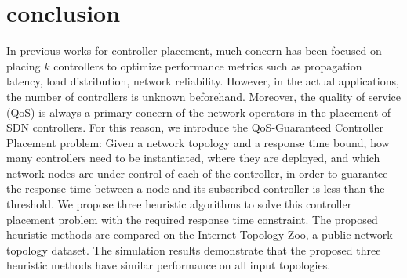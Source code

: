 \documentclass[conference]{IEEEtran}
\begin{document}
\section{conclusion}
\label{sec:conclusion}
In previous works for controller placement, much concern has been focused on placing $k$ controllers to optimize performance metrics such as propagation latency, load distribution, network reliability. However, in the actual applications, the number of controllers is unknown beforehand. Moreover, the quality of service (QoS) is always a primary concern of the network operators in the placement of SDN controllers. For this reason, we introduce the QoS-Guaranteed Controller Placement problem: Given a network topology and a response time bound, how many controllers need to be instantiated, where they are deployed, and which network nodes are under control of each of the controller, in order to guarantee the response time between a node and its subscribed controller is less than the threshold. We propose three heuristic algorithms to solve this controller placement problem with the required response time constraint. The proposed heuristic methods are compared on the Internet Topology Zoo, a public network topology dataset. The simulation results demonstrate that the proposed three heuristic methods have similar performance on all input topologies.



\end{document}
